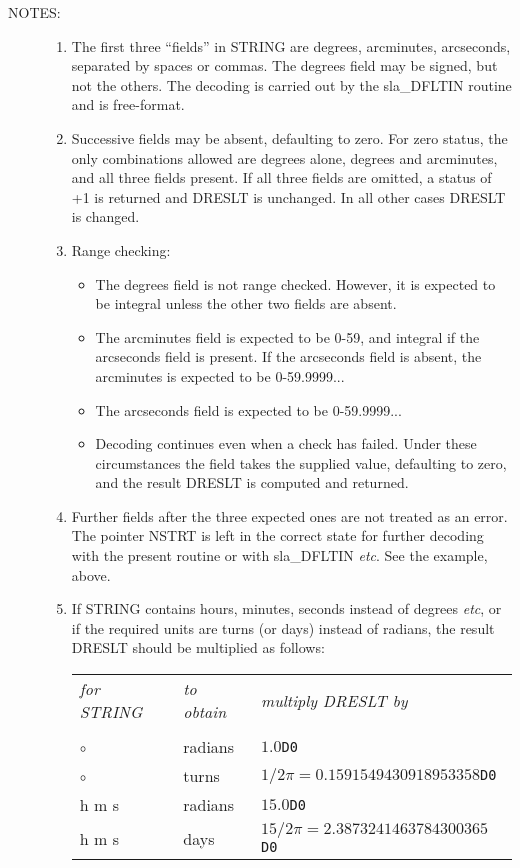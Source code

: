 \documentclass[11pt,twoside]{article}
\newlength{\oldspacing}
\newcommand{\notes}[1]
{
  \goodbreak
  \setlength{\oldspacing}{\topsep}
  \setlength{\topsep}{0.3ex}
  \begin{description}
    \item[NOTES]:
        #1
  \end{description}
  \setlength{\topsep}{\oldspacing}
}
\renewcommand{\notes}[1]
   {
      \begin{description}
         \item[NOTES:]
            #1
      \end{description}
   }
\begin{document}
\setlength{\topsep}{\oldspacing}
\notes
{
 \begin{enumerate}
  \item The first three ``fields'' in STRING are degrees, arcminutes,
   arcseconds, separated by spaces or commas.  The degrees field
   may be signed, but not the others.  The decoding is carried
   out by the sla\_DFLTIN routine and is free-format.
  \item Successive fields may be absent, defaulting to zero.  For
   zero status, the only combinations allowed are degrees alone,
   degrees and arcminutes, and all three fields present.  If all
   three fields are omitted, a status of +1 is returned and DRESLT is
   unchanged.  In all other cases DRESLT is changed.
  \item Range checking:
   \begin{itemize}
    \item The degrees field is not range checked.  However, it is
     expected to be integral unless the other two fields are absent.
    \item The arcminutes field is expected to be 0-59, and integral if
     the arcseconds field is present.  If the arcseconds field
     is absent, the arcminutes is expected to be 0-59.9999...
    \item The arcseconds field is expected to be 0-59.9999...
    \item Decoding continues even when a check has failed.  Under these
     circumstances the field takes the supplied value, defaulting to
     zero, and the result DRESLT is computed and returned.
   \end{itemize}
   \item Further fields after the three expected ones are not treated as
    an error.  The pointer NSTRT is left in the correct state for
    further decoding with the present routine or with sla\_DFLTIN
    {\it etc}.  See the example, above.
   \item If STRING contains hours, minutes, seconds instead of
    degrees {\it etc},
    or if the required units are turns (or days) instead of radians,
    the result DRESLT should be multiplied as follows: \\ [1.5ex]
    \begin{tabular}{p{6em}p{5em}p{18em}}
    {\it for STRING} & {\it to obtain} & {\it multiply DRESLT by} \\ \\
    ${\circ}$~~\raisebox{-0.7ex}{$'$}~~\raisebox{-0.7ex}{$''$}
     & radians & $1.0${\tt D0} \\
    ${\circ}$~~\raisebox{-0.7ex}{$'$}~~\raisebox{-0.7ex}{$''$}
     & turns & $1/{2 \pi} = 0.1591549430918953358${\tt D0} \\
    h m s & radians & $15.0${\tt D0} \\
    h m s & days & $15/{2\pi} = 2.3873241463784300365${\tt D0}
   \end{tabular}
 \end{enumerate}
}
\end{document}
